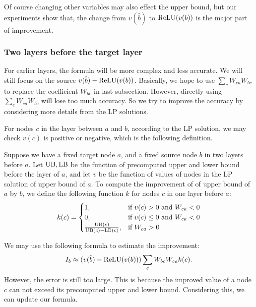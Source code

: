 Of course changing other variables may also effect the upper bound, but our experiments show that, the change from $v(\hat{b})$ to $\mathrm{ReLU}(v(b))$ is the major part of improvement. 




\subsubsection*{Two layers before the target layer}

For earlier layers, the formula will be more complex and less accurate. We will still focus on the source $v(\hat{b})-\mathrm{ReLU}(v(b))$. Basically, we hope to use $\sum_c W_{ca}W_{bc}$ to replace the coefficient $W_{bc}$ in last subsection. However, directly using $\sum_c W_{ca}W_{bc}$ will lose too much accuracy. So we try to improve the accuracy by considering more details from the LP solutions.

For nodes $c$ in the layer between $a$ and $b$, according to the LP solution, we may check $v(c)$ is positive or negative, which is the following definition. 

\begin{definition} \label{2layer}
	Suppose we have a fixed target node $a$, and a fixed source node $b$ in two layers before $a$. Let $\mathrm{UB},\mathrm{LB}$ be the function of precomputed upper and lower bound before the layer of $a$, and let $v$ be the function of values of nodes in the LP solution of upper bound of $a$. 
	To compute the improvement of of upper bound of $a$ by $b$, we define the following function $k$ for nodes $c$ in one layer before $a$:
	\begin{align}
		k(c) =
		\begin{cases}
			1, & \text{if } v(c) > 0 \text{ and } W_{ca} < 0\\
			0, & \text{if } v(c) \leq 0 \text{ and } W_{ca} < 0\\
			\frac{\mathrm{UB}(c)}{\mathrm{UB}(c)-\mathrm{LB}(c)}, & \text{if }W_{ca} > 0
		\end{cases}
	\end{align} 
\end{definition} 

We may use the following formula to estimate the improvement:  \begin{align*}
	I_b \approx (v(\hat{b})-\mathrm{ReLU}(v(b)))\sum_c W_{bc}W_{ca}k(c).
\end{align*}However, the error is still too large. This is because the improved value of a node $c$ can not exceed its precomputed upper and lower bound. Considering this, we can update our formula.

